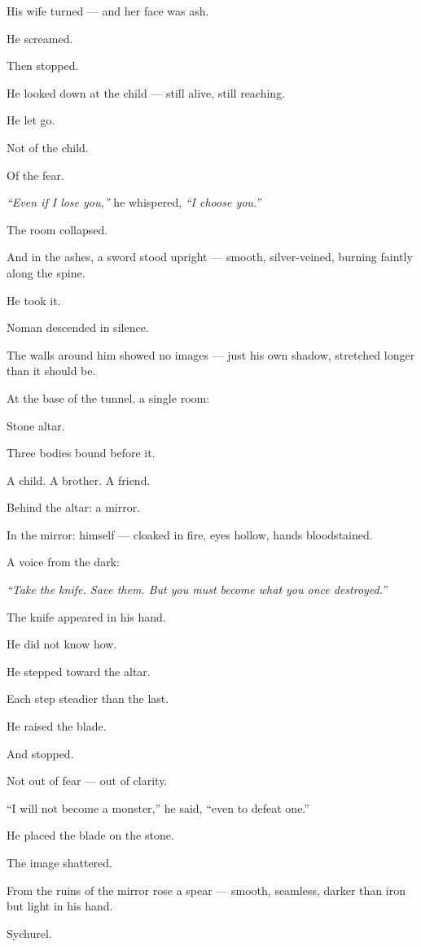 \documentclass[9pt]{article}
\begin{document}
His wife turned — and her face was ash.

He screamed.

Then stopped.

He looked down at the child — still alive, still reaching.

He let go.

Not of the child.

Of the fear.

\textit{“Even if I lose you,”} he whispered, \textit{“I choose you.”}

The room collapsed.

And in the ashes, a sword stood upright — smooth, silver-veined, burning faintly along the spine.

He took it.

\bigskip

Noman descended in silence.

The walls around him showed no images — just his own shadow, stretched longer than it should be.

At the base of the tunnel, a single room:

Stone altar.

Three bodies bound before it.

A child. A brother. A friend.

Behind the altar: a mirror.

In the mirror: himself — cloaked in fire, eyes hollow, hands bloodstained.

A voice from the dark:

\textit{“Take the knife. Save them. But you must become what you once destroyed.”}

The knife appeared in his hand.

He did not know how.

He stepped toward the altar.

Each step steadier than the last.

He raised the blade.

And stopped.

Not out of fear — out of clarity.

“I will not become a monster,” he said, “even to defeat one.”

He placed the blade on the stone.

The image shattered.

From the ruins of the mirror rose a spear — smooth, seamless, darker than iron but light in his hand.

Sychurel.
\end{document}
